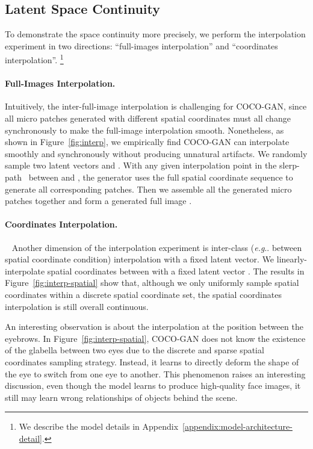 \documentclass{article}
\makeatletter
\newcommand{\modelName}{COCO-GAN }
\newcommand{\modelNamePunc}{COCO-GAN}
\newcommand\blfootnote[1]{\begingroup
  \renewcommand\thefootnote{}\footnote{#1}\addtocounter{footnote}{-1}\endgroup
}
\DeclareRobustCommand\onedot{\futurelet\@let@token\@onedot}
\def\@onedot{\ifx\@let@token.\else.\null\fi\xspace}
\def\eg{\emph{e.g}\onedot} \def\Eg{\emph{E.g}\onedot}
\makeatother
\begin{document}
    \subsection{Latent Space Continuity} 
    
        To demonstrate the space continuity more precisely, we perform the interpolation experiment in two directions: ``full-images interpolation'' and ``coordinates interpolation''. \blfootnote{\vspace{-1em} We describe the model details in Appendix~\ref{appendix:model-architecture-detail}.}
        
        \paragraph{Full-Images Interpolation.} Intuitively, the inter-full-image interpolation is challenging for \modelNamePunc, since all micro patches generated with different spatial coordinates must all change synchronously to make the full-image interpolation smooth. Nonetheless, as shown in Figure~\ref{fig:interp}, we empirically find \modelName can interpolate smoothly and synchronously without producing unnatural artifacts. We randomly sample two latent vectors  and . With any given interpolation point  in the slerp-path~\cite{slerp-interpolation} between  and , the generator uses the full spatial coordinate sequence  to generate all corresponding patches. Then we assemble all the generated micro patches together and form a generated full image .
        
        \paragraph{Coordinates Interpolation.}~\label{exp:interp-spatial} Another dimension of the interpolation experiment is inter-class (\eg between spatial coordinate condition) interpolation with a fixed latent vector. We linearly-interpolate spatial coordinates between  with a fixed latent vector . The results in Figure~\ref{fig:interp-spatial} show that, although we only uniformly sample spatial coordinates within a discrete spatial coordinate set, the spatial coordinates interpolation is still overall continuous. 
        
        An interesting observation is about the interpolation at the position between the eyebrows. In Figure~\ref{fig:interp-spatial}, \modelName does not know the existence of the glabella between two eyes due to the discrete and sparse spatial coordinates sampling strategy. Instead, it learns to directly deform the shape of the eye to switch from one eye to another. This phenomenon raises an interesting discussion, even though the model learns to produce high-quality face images, it still may learn wrong relationships of objects behind the scene.
        
\end{document}
